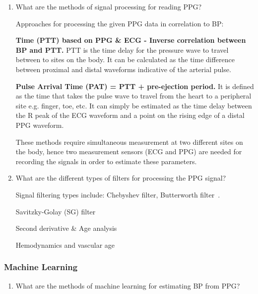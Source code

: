 \begin{enumerate}
    \item What are the methods of signal processing for reading PPG?

    Approaches for processing the given PPG data in correlation to BP:\newline

    \textbf{Time (PTT) based on PPG \& ECG - Inverse correlation between BP and PTT.} PTT is the time delay for the pressure wave to travel between to sites on the body. It can be calculated as the time difference between proximal and distal waveforms indicative of the arterial pulse.

    \textbf{Pulse Arrival Time (PAT) = PTT + pre-ejection period.} It is defined as the time that takes the pulse wave to travel from the heart to a peripheral site e.g. finger, toe, etc. It can simply be estimated as the time delay between the R peak of the ECG waveform and a point on the rising edge of a distal PPG waveform.

    These methods require simultaneous measurement at two different sites on the body, hence two measurement sensors (ECG and PPG) are needed for recording the signals in order to estimate these parameters.

    \item What are the different types of filters for processing the PPG signal?

    Signal filtering types include: Chebyshev filter, Butterworth filter~\cite{liangOptimalFilterShort2018}.

    Savitzky-Golay (SG) filter~\cite{savitzkySmoothingDifferentiationData1964}

    Second derivative \& Age analysis~\cite{takazawaAssessmentVasoactiveAgents1998}

    Hemodynamics and vascular age~\cite{charltonAssessingHemodynamicsPhotoplethysmogram2022}

\end{enumerate}

\subsubsection{Machine Learning}
\label{subsubsec:machine_learning}

\begin{enumerate}
    \item What are the methods of machine learning for estimating BP from PPG?
\end{enumerate}

